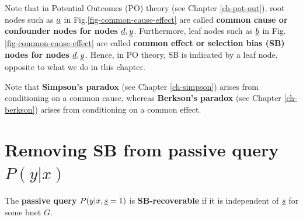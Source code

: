 Note
that in Potential
Outcomes (PO) theory
 (see Chapter \ref{ch-pot-out}),
root nodes such
as ${\underline{a}}$ in
Fig.\ref{fig-common-cause-effect}
are called {\bf common cause
 or confounder nodes
for nodes ${\underline{d}}, {\underline{y}}$}.
Furthermore, leaf nodes such as 
${\underline{b}}$ in
Fig.\ref{fig-common-cause-effect} are 
called 
{\bf common effect
or selection bias (SB) nodes
for nodes ${\underline{d}}, {\underline{y}}$}.
Hence, in PO theory,
SB is indicated
by
a leaf node,
opposite to 
what we do in this chapter.

Note that 
{\bf Simpson's paradox} (see Chapter
\ref{ch-simpson}) arises from 
conditioning on a common cause,
whereas 
{\bf Berkson's paradox}
(see Chapter \ref{ch-berkson})
arises from conditioning
on a common effect.



\section{Removing SB from 
passive query $P(y|x)$}

The {\bf  passive query} $P(y|x, {\underline{s}}=1)$
is {\bf SB-recoverable}
if it is independent of ${\underline{s}}$
for some bnet $G$.







